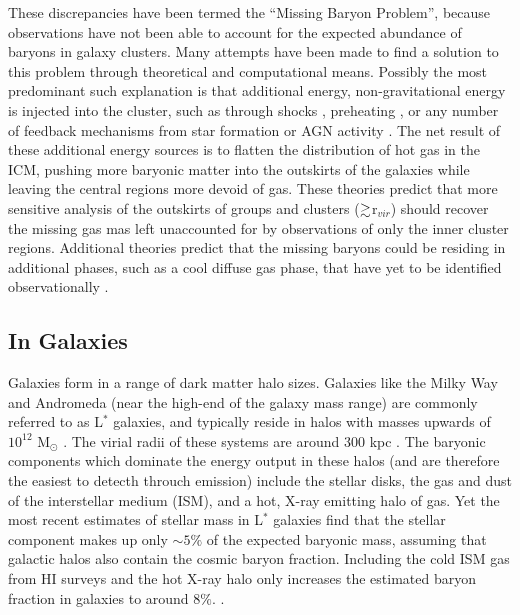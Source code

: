 These discrepancies have been termed the ``Missing Baryon Problem'',
because observations have not been able to account for the expected
abundance of baryons in galaxy clusters. Many attempts have been made
to find a solution to this problem through theoretical and
computational means. Possibly the most predominant such explanation is
that additional energy, non-gravitational energy is injected into the
cluster, such as through shocks \citep{Takizawa1998}, preheating
\citep{Bialek2001}, or any number of feedback mechanisms from star
formation or AGN activity \citep{Metzler1994, McCarthy2007,
  Bode2009}. The net result of these additional energy sources is to
flatten the distribution of hot gas in the ICM, pushing more
baryonic matter into the outskirts of the galaxies while leaving the
central regions more devoid of gas. These theories predict that more
sensitive analysis of the outskirts of groups and clusters
($\gtrsim$r$_{vir}$) should recover the missing gas mas left unaccounted
for by observations of only the inner cluster regions. Additional
theories predict that the missing baryons could be residing in
additional phases, such as a cool diffuse gas phase, that have yet to
be identified observationally \citep{Afshordi2007, Bonamente2005}. 


\subsection{In Galaxies}
\label{s.Missing.Galaxies}

Galaxies form in a range of dark matter halo sizes. Galaxies like the
Milky Way and Andromeda (near the high-end of the galaxy mass range)
are commonly referred to as L$^*$ galaxies, and typically reside in
halos with masses upwards of $10^{12}$ M$_\odot$
\citep{Moster2010}. The virial radii of these systems are around 300
kpc \citep{Werk2014}. The baryonic components which dominate the energy output in these
halos (and are therefore the easiest to detecth throuch emission)
include the stellar disks, the gas and dust of the interstellar medium
(ISM), and a hot, X-ray emitting halo of gas. Yet the most recent
estimates of stellar mass in L$^*$ galaxies \citep{Behroozi2010} find
that the stellar component makes up only $\sim5\%$ of the expected
baryonic mass, assuming that galactic halos also contain the cosmic
baryon fraction. Including the cold ISM gas from HI surveys and the
hot X-ray halo \citep[][respectively]{Martin2010, Gupta2012} only
increases the estimated baryon fraction in galaxies to around
$8\%$. .

